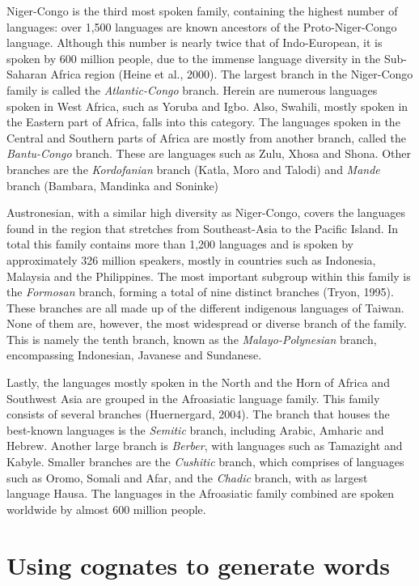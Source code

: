 Niger-Congo is the third most spoken family, containing the highest number of languages: over 1,500 languages are known ancestors of the Proto-Niger-Congo language. Although this number is nearly twice that of Indo-European, it is spoken by 600 million people, due to the immense language diversity in the Sub-Saharan Africa region (Heine et al., 2000). The largest branch in the Niger-Congo family is called the \textit{Atlantic-Congo} branch. Herein are numerous languages spoken in West Africa, such as Yoruba and Igbo. Also, Swahili, mostly spoken in the Eastern part of Africa, falls into this category. The languages spoken in the Central and Southern parts of Africa are mostly from another branch, called the \textit{Bantu-Congo} branch. These are languages such as Zulu, Xhosa and Shona. Other branches are the \textit{Kordofanian} branch (Katla, Moro and Talodi) and \textit{Mande} branch (Bambara, Mandinka and Soninke) 

Austronesian, with a similar high diversity as Niger-Congo, covers the languages found in the region that stretches from Southeast-Asia to the Pacific Island. In total this family contains more than 1,200 languages and is spoken by approximately 326 million speakers, mostly in countries such as Indonesia, Malaysia and the Philippines. The most important subgroup within this family is the \textit{Formosan} branch, forming a total of nine distinct branches (Tryon, 1995). These branches are all made up of the different indigenous languages of Taiwan. None of them are, however, the most widespread or diverse branch of the family. This is namely the tenth branch, known as the \textit{Malayo-Polynesian} branch, encompassing Indonesian, Javanese and Sundanese.  

Lastly, the languages mostly spoken in the North and the Horn of Africa and Southwest Asia are grouped in the Afroasiatic language family.  This family consists of several branches (Huernergard, 2004). The branch that houses the best-known languages is the \textit{Semitic} branch, including Arabic, Amharic and Hebrew. Another large branch is \textit{Berber}, with languages such as Tamazight and Kabyle. Smaller branches are the \textit{Cushitic} branch, which comprises of languages such as Oromo, Somali and Afar, and the \textit{Chadic} branch, with as largest language Hausa. The languages in the Afroasiatic family combined are spoken worldwide by almost 600 million people. 


\section{Using cognates to generate words}


